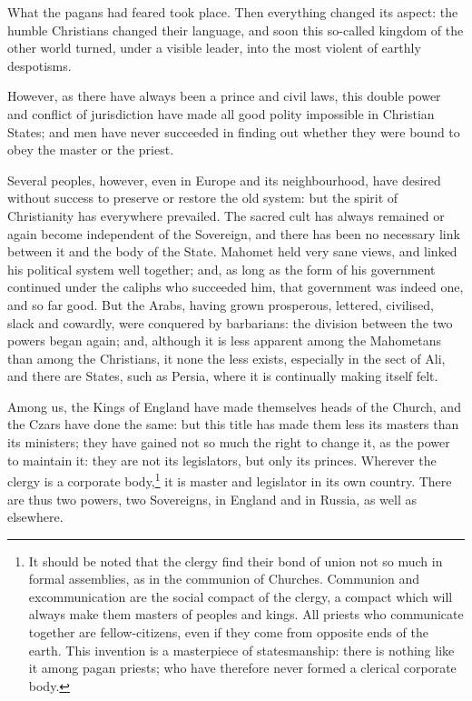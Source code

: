 \documentclass[12pt]{book}
\begin{document}
What the pagans had feared took place. Then everything changed its aspect: the humble Christians changed their language, and soon this so-called kingdom of the other world turned, under a visible leader, into the most violent of earthly despotisms.

However, as there have always been a prince and civil laws, this double power and conflict of jurisdiction have made all good polity impossible in Christian States; and men have never succeeded in finding out whether they were bound to obey the master or the priest.

Several peoples, however, even in Europe and its neighbourhood, have desired without success to preserve or restore the old system: but the spirit of Christianity has everywhere prevailed. The sacred cult has always remained or again become independent of the Sovereign, and there has been no necessary link between it and the body of the State. Mahomet held very sane views, and linked his political system well together; and, as long as the form of his government continued under the caliphs who succeeded him, that government was indeed one, and so far good. But the Arabs, having grown prosperous, lettered, civilised, slack and cowardly, were conquered by barbarians: the division between the two powers began again; and, although it is less apparent among the Mahometans than among the Christians, it none the less exists, especially in the sect of Ali, and there are States, such as Persia, where it is continually making itself felt.

Among us, the Kings of England have made themselves heads of the Church, and the Czars have done the same: but this title has made them less its masters than its ministers; they have gained not so much the right to change it, as the power to maintain it: they are not its legislators, but only its princes. Wherever the clergy is a corporate body,\footnote{It should be noted that the clergy find their bond of union not so much in formal assemblies, as in the communion of Churches. Communion and excommunication are the social compact of the clergy, a compact which will always make them masters of peoples and kings. All priests who communicate together are fellow-citizens, even if they come from opposite ends of the earth. This invention is a masterpiece of statesmanship: there is nothing like it among pagan priests; who have therefore never formed a clerical corporate body.} it is master and legislator in its own country. There are thus two powers, two Sovereigns, in England and in Russia, as well as elsewhere.
\end{document}
